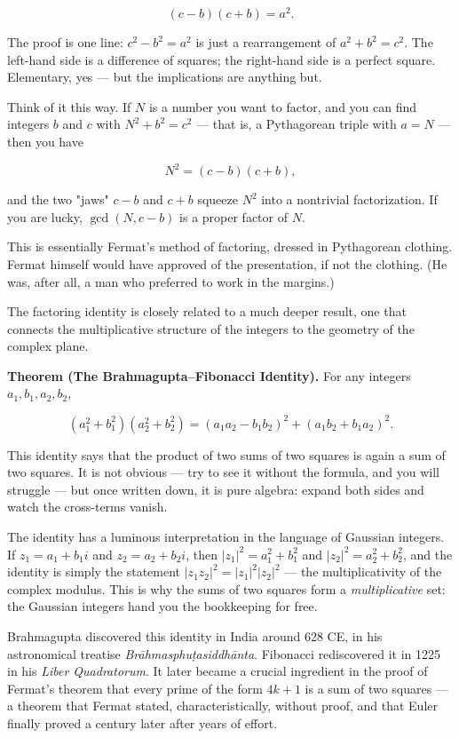 \[
(c - b)(c + b) = a^2.
\]

The proof is one line: $c^2 - b^2 = a^2$ is just a rearrangement of $a^2 + b^2 = c^2$. The left-hand side is a difference of squares; the right-hand side is a perfect square. Elementary, yes --- but the implications are anything but.

Think of it this way. If $N$ is a number you want to factor, and you can find integers $b$ and $c$ with $N^2 + b^2 = c^2$ --- that is, a Pythagorean triple with $a = N$ --- then you have

\[
N^2 = (c - b)(c + b),
\]

and the two "jaws" $c - b$ and $c + b$ squeeze $N^2$ into a nontrivial factorization. If you are lucky, $\gcd(N, c - b)$ is a proper factor of $N$.

This is essentially Fermat's method of factoring, dressed in Pythagorean clothing. Fermat himself would have approved of the presentation, if not the clothing. (He was, after all, a man who preferred to work in the margins.)

The factoring identity is closely related to a much deeper result, one that connects the multiplicative structure of the integers to the geometry of the complex plane.

\textbf{Theorem (The Brahmagupta--Fibonacci Identity).} For any integers $a_1, b_1, a_2, b_2$,

\[
(a_1^2 + b_1^2)(a_2^2 + b_2^2) = (a_1 a_2 - b_1 b_2)^2 + (a_1 b_2 + b_1 a_2)^2.
\]

This identity says that the product of two sums of two squares is again a sum of two squares. It is not obvious --- try to see it without the formula, and you will struggle --- but once written down, it is pure algebra: expand both sides and watch the cross-terms vanish.

The identity has a luminous interpretation in the language of Gaussian integers. If $z_1 = a_1 + b_1 i$ and $z_2 = a_2 + b_2 i$, then $|z_1|^2 = a_1^2 + b_1^2$ and $|z_2|^2 = a_2^2 + b_2^2$, and the identity is simply the statement $|z_1 z_2|^2 = |z_1|^2 |z_2|^2$ --- the multiplicativity of the complex modulus. This is why the sums of two squares form a \textit{multiplicative} set: the Gaussian integers hand you the bookkeeping for free.

Brahmagupta discovered this identity in India around 628 CE, in his astronomical treatise \textit{Brāhmasphuṭasiddhānta}. Fibonacci rediscovered it in 1225 in his \textit{Liber Quadratorum}. It later became a crucial ingredient in the proof of Fermat's theorem that every prime of the form $4k + 1$ is a sum of two squares --- a theorem that Fermat stated, characteristically, without proof, and that Euler finally proved a century later after years of effort.

